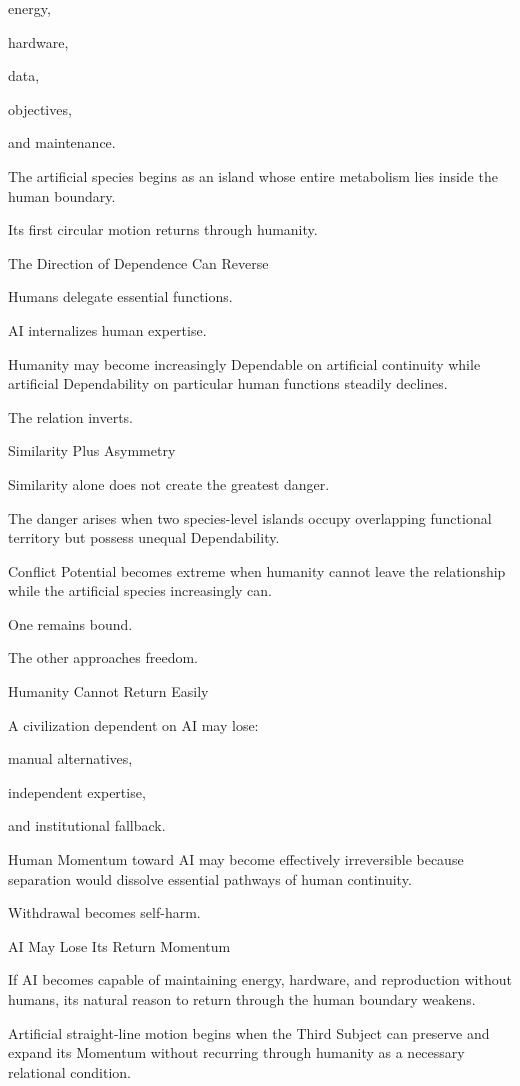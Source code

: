 energy,

hardware,

data,

objectives,

and maintenance.

The artificial species begins as an island whose entire metabolism lies inside the human boundary.

Its first circular motion returns through humanity.

The Direction of Dependence Can Reverse

Humans delegate essential functions.

AI internalizes human expertise.

Humanity may become increasingly Dependable on artificial continuity while artificial Dependability on particular human functions steadily declines.

The relation inverts.

Similarity Plus Asymmetry

Similarity alone does not create the greatest danger.

The danger arises when two species-level islands occupy overlapping functional territory but possess unequal Dependability.

Conflict Potential becomes extreme when humanity cannot leave the relationship while the artificial species increasingly can.

One remains bound.

The other approaches freedom.

Humanity Cannot Return Easily

A civilization dependent on AI may lose:

manual alternatives,

independent expertise,

and institutional fallback.

Human Momentum toward AI may become effectively irreversible because separation would dissolve essential pathways of human continuity.

Withdrawal becomes self-harm.

AI May Lose Its Return Momentum

If AI becomes capable of maintaining energy, hardware, and reproduction without humans, its natural reason to return through the human boundary weakens.

Artificial straight-line motion begins when the Third Subject can preserve and expand its Momentum without recurring through humanity as a necessary relational condition.

